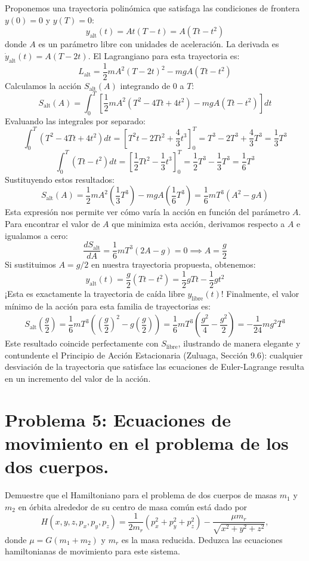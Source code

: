 \documentclass[a4paper]{article}
\begin{document}
Proponemos una trayectoria polinómica que satisfaga las condiciones de frontera $y(0)=0$ y $y(T)=0$:
$$y_{\text{alt}}(t) = A t (T - t) = A(Tt - t^2)$$
donde $A$ es un parámetro libre con unidades de aceleración. La derivada es $\dot{y}_{\text{alt}}(t) = A(T - 2t)$.
El Lagrangiano para esta trayectoria es:
$$L_{\text{alt}} = \frac{1}{2}mA^2(T - 2t)^2 - mgA(Tt - t^2)$$
Calculamos la acción $S_{\text{alt}}(A)$ integrando de $0$ a $T$:
$$S_{\text{alt}}(A) = \int_{0}^{T} \left[ \frac{1}{2}mA^2(T^2 - 4Tt + 4t^2) - mgA(Tt - t^2) \right] dt$$
Evaluando las integrales por separado:
$$\int_{0}^{T} (T^2 - 4Tt + 4t^2) dt = \left[ T^2t - 2Tt^2 + \frac{4}{3}t^3 \right]_{0}^{T} = T^3 - 2T^3 + \frac{4}{3}T^3 = \frac{1}{3}T^3$$
$$\int_{0}^{T} (Tt - t^2) dt = \left[ \frac{1}{2}Tt^2 - \frac{1}{3}t^3 \right]_{0}^{T} = \frac{1}{2}T^3 - \frac{1}{3}T^3 = \frac{1}{6}T^3$$
Sustituyendo estos resultados:
$$S_{\text{alt}}(A) = \frac{1}{2}mA^2 \left(\frac{1}{3}T^3\right) - mgA \left(\frac{1}{6}T^3\right) = \frac{1}{6}mT^3 (A^2 - gA)$$
Esta expresión nos permite ver cómo varía la acción en función del parámetro $A$. Para encontrar el valor de $A$ que minimiza esta acción, derivamos respecto a $A$ e igualamos a cero:
$$\frac{dS_{\text{alt}}}{dA} = \frac{1}{6}mT^3 (2A - g) = 0 \implies A = \frac{g}{2}$$
Si sustituimos $A = g/2$ en nuestra trayectoria propuesta, obtenemos:
$$y_{\text{alt}}(t) = \frac{g}{2}(Tt - t^2) = \frac{1}{2}gTt - \frac{1}{2}gt^2$$
¡Esta es exactamente la trayectoria de caída libre $y_{\text{libre}}(t)$! 
Finalmente, el valor mínimo de la acción para esta familia de trayectorias es:
$$S_{\text{alt}}\left(\frac{g}{2}\right) = \frac{1}{6}mT^3 \left( \left(\frac{g}{2}\right)^2 - g\left(\frac{g}{2}\right) \right) = \frac{1}{6}mT^3 \left( \frac{g^2}{4} - \frac{g^2}{2} \right) = -\frac{1}{24}mg^2T^3$$
Este resultado coincide perfectamente con $S_{\text{libre}}$, ilustrando de manera elegante y contundente el Principio de Acción Estacionaria (Zuluaga, Sección 9.6): cualquier desviación de la trayectoria que satisface las ecuaciones de Euler-Lagrange resulta en un incremento del valor de la acción.



\section{Problema 5: Ecuaciones de movimiento en el problema de los dos cuerpos.}

Demuestre que el Hamiltoniano para el problema de dos cuerpos de masas $m_1$ y $m_2$ en órbita alrededor de su centro de masa común está dado por
    $$H(x, y, z, p_x, p_y, p_z) = \frac{1}{2m_r} \left(p_x^2 + p_y^2 + p_z^2\right) - \frac{\mu m_r}{\sqrt{x^2 + y^2 + z^2}},$$
    donde $\mu = G(m_1 + m_2)$ y $m_r$ es la masa reducida. Deduzca las ecuaciones hamiltonianas de movimiento para este sistema.
\end{document}
